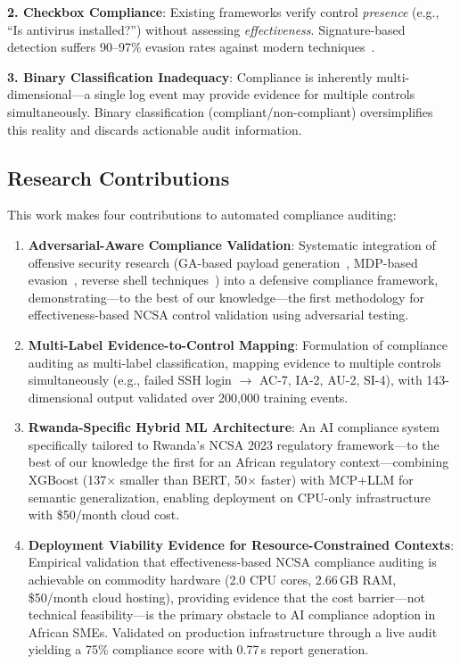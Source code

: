 \documentclass[futureinternet,article,submit,pdftex,moreauthors]{Definitions/mdpi}
\begin{document}
\textbf{2. Checkbox Compliance}: Existing frameworks verify control \textit{presence}
(e.g., ``Is antivirus installed?'') without assessing \textit{effectiveness}. Signature-based
detection suffers 90--97\% evasion rates against modern techniques~\cite{dp_payload_paper,reverse_shell_paper}.

\textbf{3. Binary Classification Inadequacy}: Compliance is inherently multi-dimensional—a
single log event may provide evidence for multiple controls simultaneously. Binary
classification (compliant/non-compliant) oversimplifies this reality and discards actionable
audit information.

\subsection{Research Contributions}

This work makes four contributions to automated compliance auditing:

\begin{enumerate}
\item \textbf{Adversarial-Aware Compliance Validation}: Systematic integration of offensive
security research (GA-based payload generation~\cite{ga_xss_paper}, MDP-based
evasion~\cite{dp_payload_paper}, reverse shell techniques~\cite{reverse_shell_paper}) into a
defensive compliance framework, demonstrating---to the best of our knowledge---the first
methodology for effectiveness-based NCSA control validation using adversarial testing.

\item \textbf{Multi-Label Evidence-to-Control Mapping}: Formulation of compliance auditing as
multi-label classification, mapping evidence to multiple controls simultaneously
(e.g., failed SSH login $\rightarrow$ AC-7, IA-2, AU-2, SI-4), with 143-dimensional output
validated over 200{,}000 training events.

\item \textbf{Rwanda-Specific Hybrid ML Architecture}: An AI compliance system specifically
tailored to Rwanda's NCSA 2023 regulatory framework---to the best of our knowledge the first
for an African regulatory context---combining XGBoost (137$\times$ smaller than BERT,
50$\times$ faster) with MCP+LLM for semantic generalization, enabling deployment on CPU-only
infrastructure with \$50/month cloud cost.

\item \textbf{Deployment Viability Evidence for Resource-Constrained Contexts}: Empirical
validation that effectiveness-based NCSA compliance auditing is achievable on commodity
hardware (2.0 CPU cores, 2.66\,GB RAM, \$50/month cloud hosting), providing evidence that
the cost barrier---not technical feasibility---is the primary obstacle to AI compliance
adoption in African SMEs. Validated on production infrastructure through a live audit
yielding a 75\% compliance score with 0.77\,s report generation.
\end{enumerate}
\end{document}

